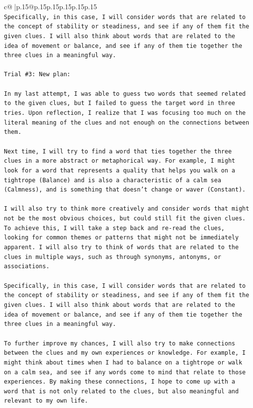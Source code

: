 \documentclass{article}
\begin{document}
{\begin{supertabular}{c@{$\;$}|p{.15\linewidth}@{}p{.15\linewidth}p{.15\linewidth}p{.15\linewidth}p{.15\linewidth}p{.15\linewidth}}
{{{\\ 
\texttt{Specifically, in this case, I will consider words that are related to the concept of stability or steadiness, and see if any of them fit the given clues. I will also think about words that are related to the idea of movement or balance, and see if any of them tie together the three clues in a meaningful way.} \\
\\ 
\texttt{Trial \#3: New plan: } \\
\\ 
\texttt{In my last attempt, I was able to guess two words that seemed related to the given clues, but I failed to guess the target word in three tries. Upon reflection, I realize that I was focusing too much on the literal meaning of the clues and not enough on the connections between them. } \\
\\ 
\texttt{Next time, I will try to find a word that ties together the three clues in a more abstract or metaphorical way. For example, I might look for a word that represents a quality that helps you walk on a tightrope (Balance) and is also a characteristic of a calm sea (Calmness), and is something that doesn't change or waver (Constant). } \\
\\ 
\texttt{I will also try to think more creatively and consider words that might not be the most obvious choices, but could still fit the given clues. To achieve this, I will take a step back and re{-}read the clues, looking for common themes or patterns that might not be immediately apparent. I will also try to think of words that are related to the clues in multiple ways, such as through synonyms, antonyms, or associations. } \\
\\ 
\texttt{Specifically, in this case, I will consider words that are related to the concept of stability or steadiness, and see if any of them fit the given clues. I will also think about words that are related to the idea of movement or balance, and see if any of them tie together the three clues in a meaningful way.} \\
\\ 
\texttt{To further improve my chances, I will also try to make connections between the clues and my own experiences or knowledge. For example, I might think about times when I had to balance on a tightrope or walk on a calm sea, and see if any words come to mind that relate to those experiences. By making these connections, I hope to come up with a word that is not only related to the clues, but also meaningful and relevant to my own life.} \\
}}}
\end{supertabular}}
\end{document}
